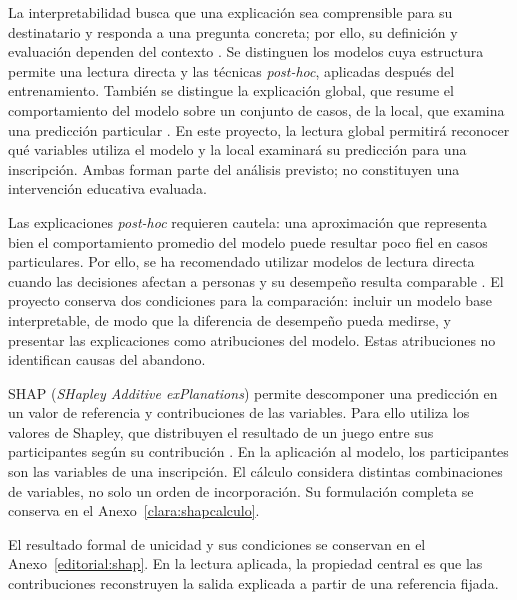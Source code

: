 La interpretabilidad busca que una explicación sea comprensible para su destinatario y responda a una pregunta concreta; por ello, su definición y evaluación dependen del contexto \cite{doshivelez2017}. Se distinguen los modelos cuya estructura permite una lectura directa y las técnicas \textit{post-hoc}, aplicadas después del entrenamiento. También se distingue la explicación global, que resume el comportamiento del modelo sobre un conjunto de casos, de la local, que examina una predicción particular \cite{03064190261439624,bdcc9110297}. En este proyecto, la lectura global permitirá reconocer qué variables utiliza el modelo y la local examinará su predicción para una inscripción. Ambas forman parte del análisis previsto; no constituyen una intervención educativa evaluada.

Las explicaciones \textit{post-hoc} requieren cautela: una aproximación que representa bien el comportamiento promedio del modelo puede resultar poco fiel en casos particulares. Por ello, se ha recomendado utilizar modelos de lectura directa cuando las decisiones afectan a personas y su desempeño resulta comparable \cite{rudin2019}. El proyecto conserva dos condiciones para la comparación: incluir un modelo base interpretable, de modo que la diferencia de desempeño pueda medirse, y presentar las explicaciones como atribuciones del modelo. Estas atribuciones no identifican causas del abandono.

SHAP (\textit{SHapley Additive exPlanations}) permite descomponer una predicción en un valor de referencia y contribuciones de las variables. Para ello utiliza los valores de Shapley, que distribuyen el resultado de un juego entre sus participantes según su contribución \cite{shapley1953,lundberg2017}. En la aplicación al modelo, los participantes son las variables de una inscripción. El cálculo considera distintas combinaciones de variables, no solo un orden de incorporación. Su formulación completa se conserva en el Anexo~\ref{clara:shapcalculo}.

El resultado formal de unicidad y sus condiciones se conservan en el Anexo~\ref{editorial:shap}. En la lectura aplicada, la propiedad central es que las contribuciones reconstruyen la salida explicada a partir de una referencia fijada.


